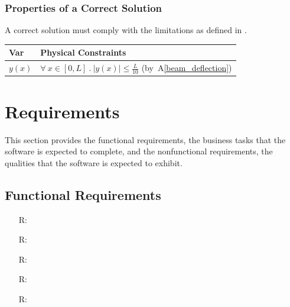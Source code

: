 \documentclass[12pt]{article}
\newcommand{\aref}[1]{A\ref{#1}}
\newcounter{reqnum} %
\begin{document}
\subsubsection{Properties of a Correct Solution}
\label{sec_CorrectSolution}

\noindent{}A correct solution must comply with the limitations as defined in
.

\begin{table}[!h]
    \caption{Output Variables}
    \label{TblOutputVar}
    \renewcommand{\arraystretch}{1.2}
    \noindent \begin{longtable*}{l l}
        \toprule
        \textbf{Var} & \textbf{Physical Constraints} \\
        \midrule
        $y(x)$ & $\forall~x \in [0, L]~.~|y(x)| \leq \frac{L}{10}$ (by~\aref{beam_deflection})
        \\
        \bottomrule
    \end{longtable*}
\end{table}



\section{Requirements}

This section provides the functional requirements, the business tasks that the
software is expected to complete, and the nonfunctional requirements, the
qualities that the software is expected to exhibit.

\subsection{Functional Requirements}

\noindent
\begin{itemize}

    \item[R\refstepcounter{reqnum}\thereqnum \label{R_Inputs}:]

    \item[R\refstepcounter{reqnum}\thereqnum \label{R_OutputInputs}:] 

    \item[R\refstepcounter{reqnum}\thereqnum \label{R_Calculate}:]

    \item[R\refstepcounter{reqnum}\thereqnum \label{R_VerifyOutput}:]

    \item[R\refstepcounter{reqnum}\thereqnum \label{R_Output}:] 

\end{itemize}
\end{document}
